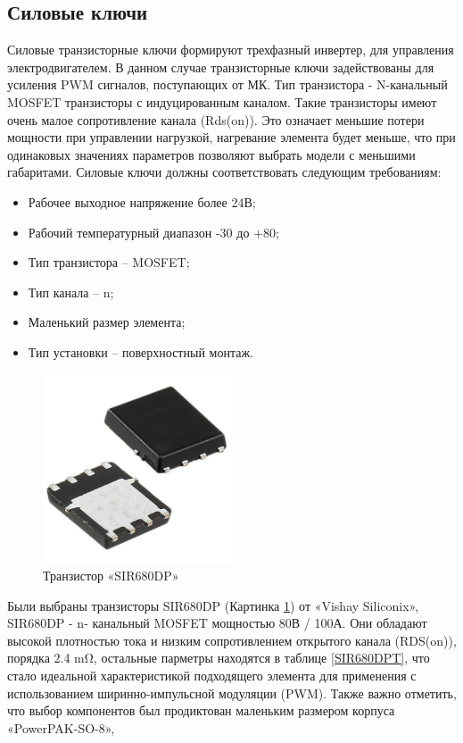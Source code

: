 \subsection{Силовые ключи}
Силовые транзисторные ключи формируют трехфазный инвертер, для управления электродвигателем.  В данном случае транзисторные ключи задействованы для усиления PWM сигналов, поступающих от МК. Тип транзистора - N-канальный MOSFET транзисторы с индуцированным каналом. Такие транзисторы имеют очень малое сопротивление канала (Rds(on)). Это означает меньшие потери мощности при управлении нагрузкой, нагревание элемента будет меньше, что при одинаковых значениях параметров позволяют выбрать модели с меньшими габаритами. Силовые ключи должны соответствовать следующим требованиям:
\begin{itemize}
	\item Рабочее выходное напряжение более 24В;
	\item Рабочий температурный диапазон -30 до +80;
	\item Тип транзистора – MOSFET;
	\item Тип канала – n;
	\item Маленький размер элемента;
	\item Тип установки – поверхностный монтаж.
\end{itemize}
\begin{figure}[H]
	\centering
	\includegraphics[width=0.5\textwidth]{Src/images/Transistir.png}
	\caption{Транзистор «SIR680DP»}
	\label{SIR680DP}
\end{figure}

Были выбраны транзисторы SIR680DP (Картинка \ref{SIR680DP}) от «Vishay Siliconix», SIR680DP - n- канальный MOSFET мощностью 80В / 100А. Они обладают высокой плотностью тока и низким сопротивлением открытого канала (RDS(on)), порядка 2.4 mΩ, остальные парметры находятся в таблице \ref{SIR680DPT}, что стало идеальной характеристикой подходящего элемента для применения с использованием ширинно-импульсной модуляции (PWM). Также важно отметить, что выбор компонентов был продиктован маленьким размером корпуса «PowerPAK-SO-8»,




